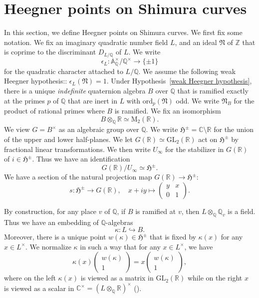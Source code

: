 \documentclass[11pt,oneside,reqno]{amsart}
\newcommand{\GL}{\mathrm{GL}}
\newcommand{\A}{\mathbb{A}}
\newcommand{\C}{\mathbb{C}}
\newcommand{\Q}{\mathbb{Q}}
\newcommand{\R}{\mathbb{R}}
\newcommand{\Z}{\mathbb{Z}}
\newcommand{\Hfrak}{\mathfrak{H}}
\newcommand{\Nfrak}{\mathfrak{N}}
\theoremstyle{plain}
\newenvironment{taggedtheorem}[1]
{\renewcommand\thetaggedtheoremx{#1}\taggedtheoremx}
{\endtaggedtheoremx}
\begin{document}
	\section{Heegner points on Shimura curves}\label{Heegner points on Shimura curves}
	In this section, we define Heegner points on Shimura curves. We first fix some notation. We fix an imaginary quadratic number field $L$, and an ideal $\Nfrak$ of $\Z$ that is coprime to the discriminant $D_{L/\Q}$ of $L$. We write
	\[
	\epsilon_{L}\colon
	\A_\Q^\times/\Q^\times\to\{\pm1\}
	\]
	for the quadratic character attached to $L/\Q$. We assume the following weak Heegner hypothesis::
	\begin{taggedtheorem}{(wH)}\label{weak Heegner hypothesis}
		$\epsilon_{L}(\Nfrak)=1$.
	\end{taggedtheorem}
	Under Hypothesis~\ref{weak Heegner hypothesis}, there is a unique \emph{indefinite} quaternion algebra $B$ over $\Q$ that is ramified exactly at the primes $p$ of $\Q$ that are inert in $L$ with $\mathrm{ord}_{p}(\Nfrak)$ odd. We write $\Nfrak_B$ for the product of rational primes where $B$ is ramified. We fix an isomorphism
	\[
	B\otimes_\Q\R
	\simeq
	\mathrm{M}_2(\R).
	\]
	We view $G=B^\times$ as an algebraic group over $\Q$. We write $\Hfrak^\pm=\C\setminus\R$ for the union of the upper and lower half-planes. We let $G(\R)\simeq\GL_2(\R)$ act on $\Hfrak^\pm$ by fractional linear transformations. We then write $U_\infty$ for the stabilizer in $G(\R)$ of $i\in\Hfrak^\pm$. Thus we have an identification
	\[
	G(\R)/U_\infty\simeq\Hfrak^\pm.
	\]
	We have a section of the natural projection map $G(\R)\to\Hfrak^\pm$:
	\[
	s\colon
	\Hfrak^\pm\to  G(\R),
	\quad
	x+iy\mapsto
	\begin{pmatrix}
		y & x \\ 0 & 1
	\end{pmatrix}.
	\]
	
	By construction, for any place $v$ of $\Q$, if $B$ is ramified at $v$, then $L\otimes_\Q\Q_v$ is a field. Thus we have an embedding of $\Q$-algebras
	\[
	\kappa
	\colon
	L\hookrightarrow B.
	\]
	Moreover, there is a unique point $w(\kappa)\in\Hfrak^\pm$ that is fixed by $\kappa(x)$ for any $x\in L^\times$. We normalize $\kappa$ in such a way that for any $x\in L^\times$, we have
	\[
	\kappa(x)
	\begin{pmatrix}
		w(\kappa) \\ 1
	\end{pmatrix}
	=
	x
	\begin{pmatrix}
		w(\kappa) \\ 1
	\end{pmatrix},
	\]
	where on the left $\kappa(x)$ is viewed as a matrix in $\GL_2(\R)$ while on the right $x$ is viewed as a scalar in $\C^\times=(L\otimes_\Q\R)^\times$ (\cite[§1.2]{Howard2004b}).
	
\end{document}
